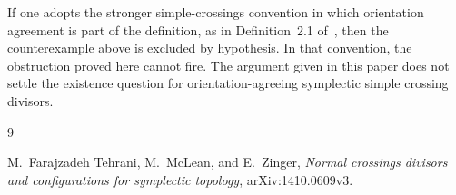 \documentclass[12pt]{article}
\begin{document}
If one adopts the stronger simple-crossings convention in which orientation agreement is part of the definition, as in Definition~2.1 of~\cite{FMZ}, then the counterexample above is excluded by hypothesis. In that convention, the obstruction proved here cannot fire. The argument given in this paper does not settle the existence question for orientation-agreeing symplectic simple crossing divisors.

\begin{thebibliography}{9}

M.~Farajzadeh Tehrani, M.~McLean, and E.~Zinger,
\emph{Normal crossings divisors and configurations for symplectic topology},
arXiv:1410.0609v3.

\end{thebibliography}
\end{document}
